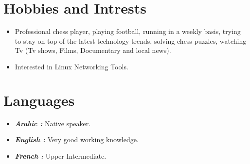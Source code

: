 \documentclass[12pt,a4paper,sans]{moderncv}
\begin{document}
	\section{Hobbies and Intrests}
	\vspace{3ex}
	\begin{itemize}
		
		\item{Professional chess player, playing football, running in a weekly basis,  trying to stay on top of the latest technology trends, solving chess puzzles, watching Tv (Tv shows, Films, Documentary and local news).}
		\vspace{3ex}
		\item {Interested in Linux Networking Tools.}
		
	\end{itemize}
	
	\section{Languages}
	\vspace{3ex}	
	\begin{itemize}
		
		\item{\textbf{\emph{ Arabic : }} Native speaker.				}
		\vspace{1ex}
		\item{\textbf{\emph{English : }} Very good working knowledge.	}
		\vspace{1ex}
		\item{\textbf{\emph{French  : }} Upper Intermediate.			}
		\vspace{1ex}
	\end{itemize}
	
	
\end{document}
